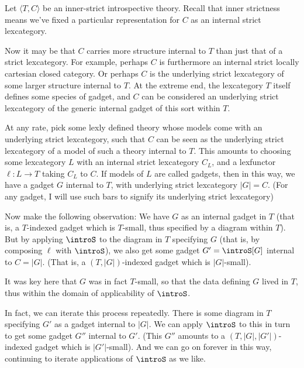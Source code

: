 \begin{observation}\label{IntrospContainsGLObservation}

Let $\langle T, C \rangle$ be an inner-strict introspective theory. Recall that inner strictness means we've fixed a particular representation for $C$ as an internal strict lexcategory.

Now it may be that $C$ carries more structure internal to $T$ than just that of a strict lexcategory. For example, perhaps $C$ is furthermore an internal strict locally cartesian closed category. Or perhaps $C$ is the underlying strict lexcategory of some larger structure internal to $T$. At the extreme end, the lexcategory $T$ itself defines some species of gadget, and $C$ can be considered an underlying strict lexcategory of the generic internal gadget of this sort within $T$.

At any rate, pick some lexly defined theory whose models come with an underlying strict lexcategory, such that $C$ can be seen as the underlying strict lexcategory of a model of such a theory internal to $T$. This amounts to choosing some lexcategory $L$ with an internal strict lexcategory $C_L$, and a lexfunctor $\ell: L \to T$ taking $C_L$ to $C$. If models of $L$ are called gadgets, then in this way, we have a gadget $G$ internal to $T$, with underlying strict lexcategory $|G| = C$. (For any gadget, I will use such bars to signify its underlying strict lexcategory)

Now make the following observation: We have $G$ as an internal gadget in $T$ (that is, a $T$-indexed gadget which is $T$-small, thus specified by a diagram within $T$). But by applying $\introS$ to the diagram in $T$ specifying $G$ (that is, by composing $\ell$ with $\introS$), we also get some gadget $G' = \introS[G]$ internal to $C = |G|$. (That is, a $(T, |G|)$-indexed gadget which is $|G|$-small).

It was key here that $G$ was in fact $T$-small, so that the data defining $G$ lived in $T$, thus within the domain of applicability of $\introS$.

In fact, we can iterate this process repeatedly. There is some diagram in $T$ specifying $G'$ as a gadget internal to $|G|$. We can apply $\introS$ to this in turn to get some gadget $G''$ internal to $G'$. (This $G''$ amounts to a $(T, |G|, |G'|)$-indexed gadget which is $|G'|$-small). And we can go on forever in this way, continuing to iterate applications of $\introS$ as we like.


\end{observation}
